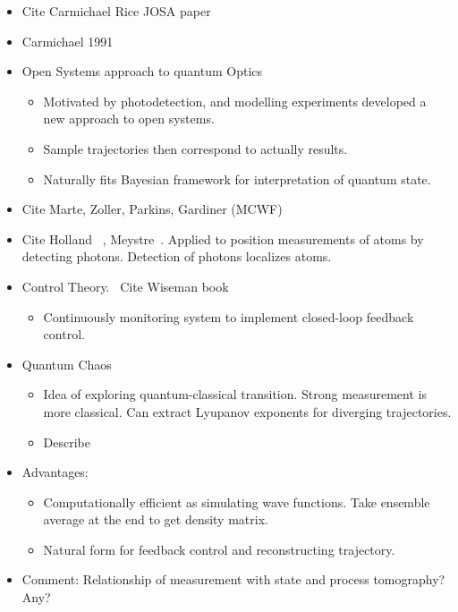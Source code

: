 \begin{itemize}
\item Cite Carmichael Rice JOSA paper~\cite{Carmichael1989}
\item Carmichael 1991 ~\cite{Carmichael1991}
\item Open Systems approach to quantum Optics\cite{Carmichael1993}
\begin{itemize}
\item Motivated by photodetection, and modelling experiments developed a new approach to open systems.  
\item Sample trajectories then correspond to actually results.
\item Naturally fits Bayesian framework for interpretation of quantum state.  
\end{itemize}
\item Cite Marte, Zoller, Parkins, Gardiner (MCWF)  \cite{Dalibard1992,Dum1992,Gardiner1992}

\item Cite Holland ~\cite{Holland1996}, Meystre~\cite{Greenwood1997}.
  Applied to position measurements of atoms by detecting photons.
  Detection of photons localizes atoms.  
\item Control Theory.~\cite{Wiseman1993}  Cite Wiseman book
\begin{itemize}
  \item Continuously monitoring system to implement closed-loop feedback control.  
\end{itemize}
\item Quantum Chaos
\begin{itemize}
  \item Idea of exploring quantum-classical transition.
  Strong measurement is more classical.
  Can extract Lyupanov exponents for diverging trajectories.
  \cite{Bhattacharya2000,Habib2002,Habib2006}
\cite{Scott2001}
  \item Describe 
\end{itemize}
\item Advantages:
\begin{itemize}
  \item Computationally efficient as simulating wave functions.
  Take ensemble average at the end to get density matrix.  
  \item Natural form for feedback control and reconstructing trajectory.  
\end{itemize}
\item Comment: Relationship of measurement with state and process tomography?  Any?  


\end{itemize}
